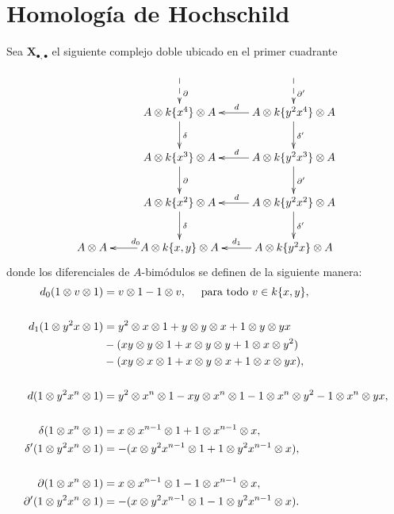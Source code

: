 \documentclass[fleqn,../tesis.tex]{subfiles}
\begin{document}
\section{Homología de Hochschild}
Sea $\mathbf{X}_{\bullet,\bullet}$ el siguiente complejo doble ubicado en el primer cuadrante
\begin{align*}
\xymatrix{
	& & \\
	& A \ox k\{x^4\} \ox A \ar[d]^{\delta} \ar@{<--}[u]_{\partial} & A \ox k\{y^2x^4\} \ox A \ar[l]_d \ar[d]^{\delta'} \ar@{<--}[u]_{\partial'} \\
	& A \ox k\{x^3\} \ox A \ar[d]^{\partial} & A \ox k\{y^2x^3\} \ox A \ar[l]_d \ar[d]^{\partial'} \\
	& A \ox k\{x^2\} \ox A \ar[d]^{\delta} & A \ox k \{y^2x^2\} \ox A \ar[l]_d \ar[d]^{\delta'} \\
	A \ox A & A \ox k\{x, y\} \ox A \ar[l]_{d_0} & A \ox k \{y^2x\} \ox A \ar[l]_{d_1} \\
}
\end{align*}
donde los diferenciales de $A$-bimódulos se definen de la siguiente manera:
\begin{align*}
	d_0(1 \otimes v \otimes 1) &= v \otimes 1 - 1 \otimes v, \quad\text{ para todo } v \in k\{x, y\}, \\
	\\
	d_1(1 \otimes y^2x \otimes 1) &= y^2 \otimes x \otimes 1 + y \otimes y \otimes x + 1 \otimes y \otimes yx \\
		&-(xy \otimes y \otimes 1 + x \otimes y \otimes y + 1 \otimes x \otimes y^2) \\
		&-(xy \otimes x \otimes 1 + x \otimes y \otimes x + 1 \otimes x \otimes yx), \\
	\\	
	d(1 \otimes y^2x^n \otimes 1) &= y^2 \otimes x^n \otimes 1 - xy \otimes x^n \otimes 1 - 1 \otimes x^n \otimes y^2 - 1 \otimes x^n \otimes yx,\\
	\\	
	\delta(1 \otimes x^n \otimes 1) &= x \otimes x^{n -1} \otimes 1 + 1 \otimes x^{n - 1} \otimes x,\\
	\delta'(1 \otimes y^2x^n \otimes 1) &= - (x \otimes y^2 x^{n -1} \otimes 1 + 1 \otimes y^2x^{n - 1} \otimes x),\\
	\\	
	\partial(1 \otimes x^n \otimes 1) &= x \otimes x^{n -1} \otimes 1 - 1 \otimes x^{n - 1} \otimes x,\\
	\partial'(1 \otimes y^2x^n \otimes 1) &= -(x \otimes y^2 x^{n -1} \otimes 1 - 1 \otimes y^2x^{n - 1} \otimes x). \\
\end{align*}
\end{document}
